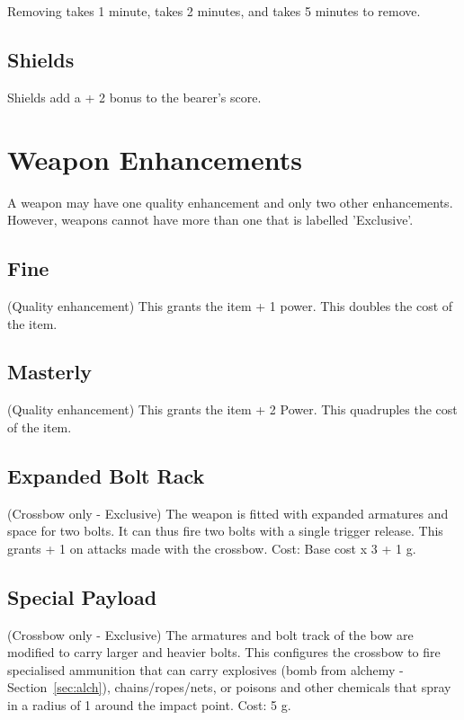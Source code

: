 Removing  takes 1 minute,  takes 2 minutes, and  takes 5 minutes to remove.


\subsection{Shields}
\label{sec:shields}
Shields add a + 2 bonus to the bearer's  score. 


\section{Weapon Enhancements}
A weapon may have one quality enhancement and only two other enhancements. However, weapons cannot have more than one that is labelled 'Exclusive'.


\subsection{Fine}
(Quality enhancement) This grants the item + 1 power. This doubles the cost of the item. 

\subsection{Masterly}
(Quality enhancement) This grants the item + 2 Power. This quadruples the cost of the item.

\subsection{Expanded Bolt Rack}
(Crossbow only - Exclusive) The weapon is fitted with expanded armatures and space for two bolts. It can thus fire two bolts with a single trigger release. This grants  + 1 on attacks made with the crossbow. Cost: Base cost x 3 + 1 g. 

\subsection{Special Payload}
(Crossbow only - Exclusive) The armatures and bolt track of the bow are modified to carry larger and heavier bolts. This configures the crossbow to fire specialised ammunition that can carry explosives (bomb from alchemy - Section~\ref{sec:alch}), chains/ropes/nets, or poisons and other chemicals that spray in a radius of 1 around the impact point. Cost: 5 g.

